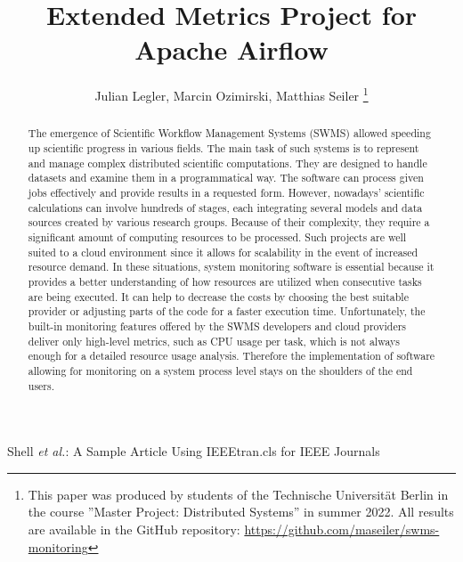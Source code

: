 \documentclass[a4paper,journal]{IEEEtran}
\begin{document}
	
	\title{Extended Metrics Project for Apache Airflow}%
	
	
	
	\author{Julian Legler, Marcin Ozimirski, Matthias Seiler
		\thanks{This paper was produced by students of the Technische Universität Berlin in the course ''Master Project: Distributed Systems'' in summer 2022. All results are available in the GitHub repository: \url{https://github.com/maseiler/swms-monitoring}}%
	}
	
	{Shell \MakeLowercase{\textit{et al.}}: A Sample Article Using IEEEtran.cls for IEEE Journals}
	
	
	\maketitle
	
	\begin{abstract}
		
		The emergence of Scientific Workflow Management Systems (SWMS) allowed speeding up scientific progress in various fields. The main task of such systems is to represent and manage complex distributed scientific computations. They are designed to handle datasets and examine them in a programmatical way. The software can process given jobs effectively and provide results in a requested form. However, nowadays' scientific calculations can involve hundreds of stages, each integrating several models and data sources created by various research groups. Because of their complexity, they require a significant amount of computing resources to be processed. Such projects are well suited to a cloud environment since it allows for scalability in the event of increased resource demand. In these situations, system monitoring software is essential because it provides a better understanding of how resources are utilized when consecutive tasks are being executed. It can help to decrease the costs by choosing the best suitable provider or adjusting parts of the code for a faster execution time. Unfortunately, the built-in monitoring features offered by the SWMS developers and cloud providers deliver only high-level metrics, such as CPU usage per task, which is not always enough for a detailed resource usage analysis. Therefore the implementation of software allowing for monitoring on a system process level stays on the shoulders of the end users. 
		
		
	\end{abstract}
	
\end{document}
